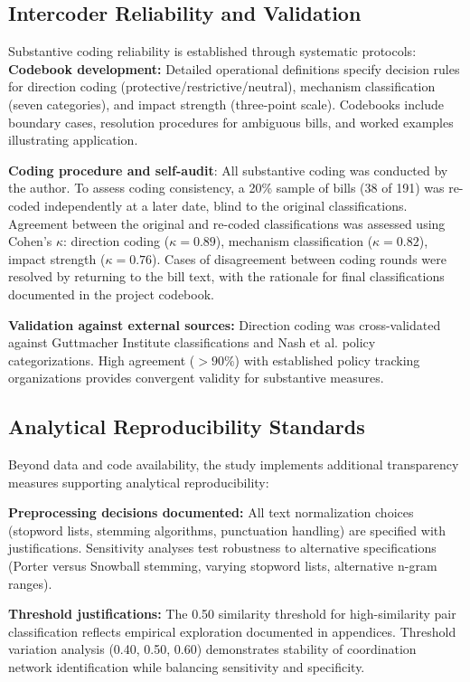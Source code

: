 \subsection{Intercoder Reliability and Validation}
Substantive coding reliability is established through systematic protocols:
\textbf{Codebook development:} Detailed operational definitions specify decision rules for direction coding (protective/restrictive/neutral), mechanism classification (seven categories), and impact strength (three-point scale). Codebooks include boundary cases, resolution procedures for ambiguous bills, and worked examples illustrating application.

\textbf{Coding procedure and self-audit}: All substantive coding was conducted by the author. To assess coding consistency, a 20\% sample of bills (38 of 191) was re-coded independently at a later date, blind to the original classifications. Agreement between the original and re-coded classifications was assessed using Cohen's $\kappa$: direction coding ($\kappa = 0.89$), mechanism classification ($\kappa = 0.82$), impact strength ($\kappa = 0.76$). Cases of disagreement between coding rounds were resolved by returning to the bill text, with the rationale for final classifications documented in the project codebook.

\textbf{Validation against external sources:} Direction coding was cross-validated against Guttmacher Institute classifications and Nash et al. policy categorizations. High agreement ($>90\%$) with established policy tracking organizations provides convergent validity for substantive measures.

\subsection{Analytical Reproducibility Standards}
Beyond data and code availability, the study implements additional transparency measures supporting analytical reproducibility:

\textbf{Preprocessing decisions documented:} All text normalization choices (stopword lists, stemming algorithms, punctuation handling) are specified with justifications. Sensitivity analyses test robustness to alternative specifications (Porter versus Snowball stemming, varying stopword lists, alternative n-gram ranges).

\textbf{Threshold justifications:} The 0.50 similarity threshold for high-similarity pair classification reflects empirical exploration documented in appendices. Threshold variation analysis (0.40, 0.50, 0.60) demonstrates stability of coordination network identification while balancing sensitivity and specificity.

